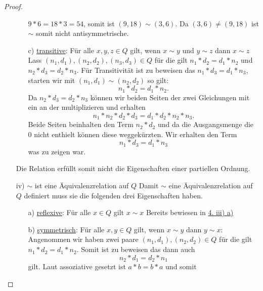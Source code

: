 \documentclass{exam}
\begin{document}
\begin{proof}
\begin{enumerate}
\begin{enumerate}
                        $9*6 = 18 * 3 = 54$, somit ist $(9,18) \sim (3,6)$.
                        Da $(3,6) \neq (9,18)$ ist $\sim$ somit nicht antisymmetrische.
                  \item [c)] \underline{transitive}: Für alle $x,y,z \in Q$ gilt, wenn $x \sim y$ und $y \sim z$ dann $x \sim z$ \newline
                        Lass $(n_1,d_1), (n_2,d_2), (n_3, d_3) \in Q$ für die gilt $n_1*d_2 = d_1*n_2$ und $n_2*d_3=d_2*n_3$.
                        Für Transitivität ist zu beweisen das $n_1*d_3=d_1*n_3$, starten wir mit $(n_1, d_1) \sim (n_2, d_2)$ so gilt: \[
                            n_1*d_2 = d_1*n_2.
                        \]
                        Da $n_2*d_3=d_2*n_3$ können wir beiden Seiten der zwei Gleichungen mit ein an
                        der multiplizieren und erhalten \[
                            n_1*n_2*d_2*d_3 = d_1*d_2*n_2*n_3.
                        \]
                        Beide Seiten beinhalten den Term $n_2*d_2$ und da die Ausgangsmenge die $0$
                        nicht enthielt können diese weggekürzten. Wir erhalten den Term \[
                            n_1*d_3 = d_1*n_3
                        \] was zu zeigen war. \checkmark
              \end{enumerate}
              Die Relation erfüllt somit nicht die Eigenschaften einer partiellen Ordnung.
        \item [iv)] $\sim$ ist eine Äquivalenzrelation auf $Q$ \newline
              Damit $\sim$ eine Äquivalenzrelation auf $Q$ definiert muss sie die folgenden drei Eigenschaften haben.
              \begin{enumerate}
                  \item [a)] \underline{reflexive}: Für alle $x \in Q$ gilt $x \sim x$ \newline
                        Bereits bewiesen in \underline{4. iii) a)}
                  \item [b)] \underline{symmetrisch}: Für alle $x,y \in Q$ gilt, wenn $x \sim y$ dann $y \sim x$: \newline
                        Angenommen wir haben zwei paare $(n_1,d_1),(n_2,d_2) \in Q$ für die gilt $n_1*d_2=d_1*n_2$.
                        Somit ist zu beweisen das dann auch \[
                            n_2*d_1 = d_2*n_1
                        \] gilt. \newline\newline Laut assoziative gesetzt ist $a*b = b*a$ und somit

\end{enumerate}
\end{enumerate}
\end{proof}
\end{document}
